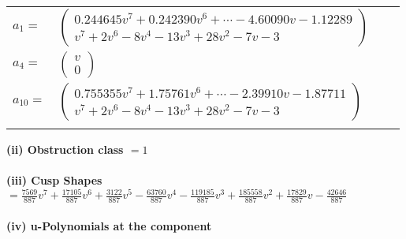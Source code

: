\documentclass[1p]{elsarticle_modified}
\theoremstyle{definition}
\begin{document}
\begin{tabular}{m{7pt} m{180pt} m{7pt} m{180pt} }
\flushright $a_{1}=$&$\begin{pmatrix}0.244645 v^{7}+0.242390 v^{6}+\cdots-4.60090 v-1.12289\\v^7+2 v^6-8 v^4-13 v^3+28 v^2-7 v-3\end{pmatrix}$ \\
\flushright $a_{4}=$&$\begin{pmatrix}v\\0\end{pmatrix}$ \\
\flushright $a_{10}=$&$\begin{pmatrix}0.755355 v^{7}+1.75761 v^{6}+\cdots-2.39910 v-1.87711\\v^7+2 v^6-8 v^4-13 v^3+28 v^2-7 v-3\end{pmatrix}$\\&\end{tabular}
\flushleft \textbf{(ii) Obstruction class $= 1$}\\~\\
\flushleft \textbf{(iii) Cusp Shapes $= \frac{7569}{887} v^7+\frac{17105}{887} v^6+\frac{3122}{887} v^5-\frac{63760}{887} v^4-\frac{119185}{887} v^3+\frac{185558}{887} v^2+\frac{17829}{887} v-\frac{42646}{887}$}\\~\\
\newpage\renewcommand{\arraystretch}{1}
\flushleft \textbf{(iv) u-Polynomials at the component}\newline \\
\end{document}
